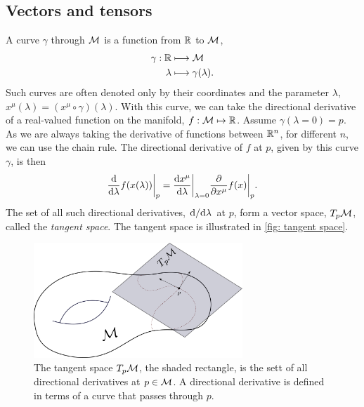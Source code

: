\subsection{Vectors and tensors}

A curve $\gamma$ through $\mathcal{M}$ is a function from $\mathbb{R}$ to $\mathcal{M}$,
%
\begin{align}
    \gamma : \mathbb{R} &\longmapsto \mathcal{M} \\
    \lambda & \longmapsto \gamma(\lambda).
\end{align}
%
Such curves are often denoted only by their coordinates and the parameter $\lambda$, $x^\mu(\lambda) = (x^\mu \circ \gamma)(\lambda)$.
With this curve, we can take the directional derivative of a real-valued function on the manifold, $f: \mathcal{M} \mapsto \mathbb{R}$.
Assume $\gamma(\lambda = 0) = p$.
As we are always taking the derivative of functions between $\mathbb{R}^n$, for different $n$, we can use the chain rule.
The directional derivative of $f$ at $p$, given by this curve $\gamma$, is then
%
\begin{equation}
    \odv{}{\lambda} f(x(\lambda)) \bigg |_p = \odv{x^\mu}{\lambda} \bigg |_{\lambda = 0}  \pdv{}{x^\mu} f(x) \bigg |_p.
\end{equation}
%
The set of all such directional derivatives, $\odv{}/{\lambda}$ at $p$, form a vector space, $T_p \mathcal{M}$, called the \emph{tangent space}.
The tangent space is illustrated in \autoref{fig: tangent space}.


\begin{figure}[H]
    \centering
    \includegraphics[width=0.7\textwidth]{figurer/tangent space.pdf} 
    \caption{
        The tangent space $T_p \mathcal{M}$, the shaded rectangle, is the sett of all directional derivatives at $p\in \mathcal{M}$. A directional derivative is defined in terms of a curve that passes through $p$.
        } 
    \label{fig: tangent space}
\end{figure} 


